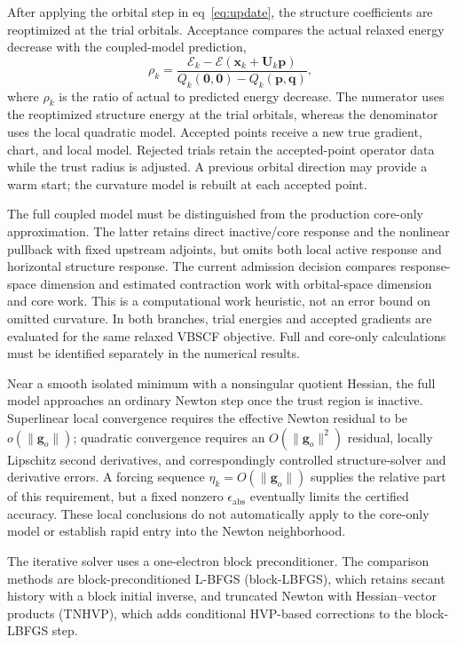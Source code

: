 \documentclass[12pt]{article}
\begin{document}
After applying the orbital step in eq~\eqref{eq:update}, the structure coefficients are reoptimized at the trial orbitals. Acceptance compares the actual relaxed energy decrease with the coupled-model prediction,
\begin{equation}
 \rho_k=\frac{\mathcal E_k-\mathcal E(\mathbf x_k+\mathbf U_k\mathbf p)}
 {Q_k(\mathbf0,\mathbf0)-Q_k(\mathbf p,\mathbf q)},
 \label{eq:agreement}
\end{equation}
where \(\rho_k\) is the ratio of actual to predicted energy decrease. The numerator uses the reoptimized structure energy at the trial orbitals, whereas the denominator uses the local quadratic model. Accepted points receive a new true gradient, chart, and local model. Rejected trials retain the accepted-point operator data while the trust radius is adjusted. A previous orbital direction may provide a warm start; the curvature model is rebuilt at each accepted point.

The full coupled model must be distinguished from the production core-only approximation. The latter retains direct inactive/core response and the nonlinear pullback with fixed upstream adjoints, but omits both local active response and horizontal structure response. The current admission decision compares response-space dimension and estimated contraction work with orbital-space dimension and core work. This is a computational work heuristic, not an error bound on omitted curvature. In both branches, trial energies and accepted gradients are evaluated for the same relaxed VBSCF objective. Full and core-only calculations must be identified separately in the numerical results.

Near a smooth isolated minimum with a nonsingular quotient Hessian, the full model approaches an ordinary Newton step once the trust region is inactive. Superlinear local convergence requires the effective Newton residual to be \(o(\|\mathbf g_o\|)\); quadratic convergence requires an \(O(\|\mathbf g_o\|^2)\) residual, locally Lipschitz second derivatives, and correspondingly controlled structure-solver and derivative errors. A forcing sequence \(\eta_k=O(\|\mathbf g_o\|)\) supplies the relative part of this requirement, but a fixed nonzero \(\epsilon_{\mathrm{abs}}\) eventually limits the certified accuracy. These local conclusions do not automatically apply to the core-only model or establish rapid entry into the Newton neighborhood.

The iterative solver uses a one-electron block preconditioner. The comparison methods are block-preconditioned L-BFGS (block-LBFGS), which retains secant history with a block initial inverse, and truncated Newton with Hessian--vector products (TNHVP), which adds conditional HVP-based corrections to the block-LBFGS step.
\end{document}
